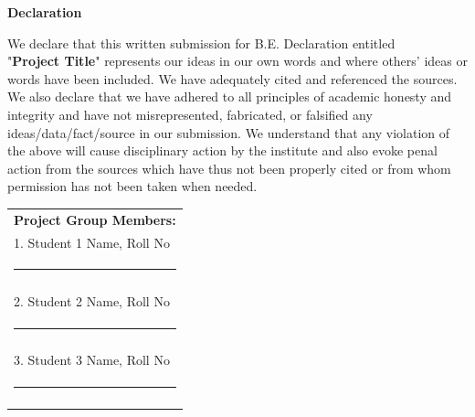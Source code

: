 
\begin{centering}
\large
{\LARGE\bf Declaration}\\
\end{centering}

\justify
We declare that this written submission for B.E. Declaration entitled \\
"{\bf Project Title}" represents our ideas in our own words and where others' ideas or words have been included. We have adequately cited and referenced the sources. We also declare that we have adhered to all principles of academic honesty and integrity and have not misrepresented, fabricated, or falsified any ideas/data/fact/source in our submission. We understand that any violation of the above will cause disciplinary action by the institute and also evoke penal action from the sources which have thus not been properly cited or from whom permission has not been taken when needed.  \\ 

\vspace{3cm}
\hfill%
\begin{tabular}[t]{l@{}}
\vspace{1cm}

{\textbf{Project Group Members:}} \\ 
\vspace{1cm}

1. Student 1 Name, Roll No \\
\noindent\rule{5cm}{0.10pt} \\
\\
\vspace{1cm}

2. Student 2 Name, Roll No \\
\noindent\rule{5cm}{0.10pt} \\
\\
\vspace{1cm}

3. Student 3 Name, Roll No \\
 \noindent\rule{5cm}{0.10pt}
\\
\vspace{1cm}
\end{tabular}



